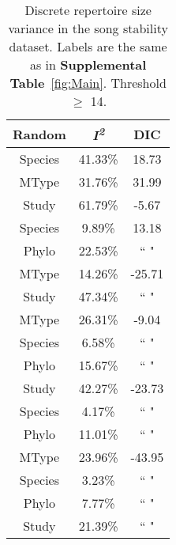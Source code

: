 \documentclass{article}
\begin{document}
  \begin{table}[H]
  \centering
  \caption{Discrete repertoire size variance in the song stability dataset. Labels are the same as in \textbf{Supplemental Table}~\ref{fig:Main}. Threshold $\ge$ 14.} 
  \begin{tabular}{ccc}
  \hline
  Random & \textit{I\textsuperscript{2}} & DIC \\ 
  \hline
  Species & 41.33\% & 18.73 \\ \hdashline
  MType & 31.76\% & 31.99 \\ \hdashline
  Study & 61.79\% & -5.67 \\ \hdashline
  Species & 9.89\% & 13.18 \\ 
  Phylo & 22.53\% & `` " \\ \hdashline
  MType & 14.26\% & -25.71 \\ 
  Study & 47.34\% & `` " \\ \hdashline
  MType & 26.31\% & -9.04 \\ 
  Species & 6.58\% & `` " \\ 
  Phylo & 15.67\% & `` " \\ \hdashline
  Study & 42.27\% & -23.73 \\ 
  Species & 4.17\% & `` " \\ 
  Phylo & 11.01\% & `` " \\ \hdashline
  MType & 23.96\% & -43.95 \\ 
  Species & 3.23\% & `` " \\ 
  Phylo & 7.77\% & `` " \\ 
  Study & 21.39\% & `` " \\ 
  \hline
  \end{tabular}
  \end{table}
\end{document}
